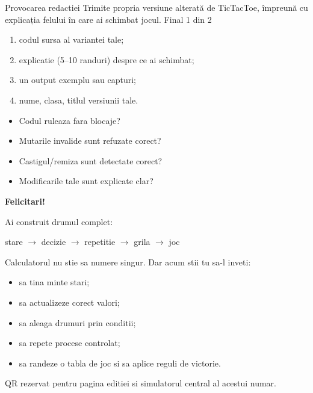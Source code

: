 \PageHeader
  {Provocarea redactiei}
  {Trimite propria versiune alterată de TicTacToe, împreună cu explicația felului în care ai schimbat jocul.}
  {Final 1 din 2}

\begin{bossbox}[Ce trimiti]
\begin{enumerate}
\item codul sursa al variantei tale;
\item explicatie (5--10 randuri) despre ce ai schimbat;
\item un output exemplu sau capturi;
\item nume, clasa, titlul versiunii tale.
\end{enumerate}
\end{bossbox}

\begin{solobox}
\begin{itemize}
\item Codul ruleaza fara blocaje?
\item Mutarile invalide sunt refuzate corect?
\item Castigul/remiza sunt detectate corect?
\item Modificarile tale sunt explicate clar?
\end{itemize}
\end{solobox}

\begin{conceptbox}
\end{conceptbox}

\clearpage

\thispagestyle{empty}
\begin{center}
{\Huge\bfseries Felicitari!}\par
\vspace{1.2em}
{\Large Ai construit drumul complet:}\par
\vspace{0.5em}
{\large stare \(\rightarrow\) decizie \(\rightarrow\) repetitie \(\rightarrow\) grila \(\rightarrow\) joc}
\end{center}

\vspace{1.8em}
\begin{missionbox}
Calculatorul nu stie sa numere singur. Dar acum stii tu sa-l inveti:
\begin{itemize}
\item sa tina minte stari;
\item sa actualizeze corect valori;
\item sa aleaga drumuri prin conditii;
\item sa repete procese controlat;
\item sa randeze o tabla de joc si sa aplice reguli de victorie.
\end{itemize}
\end{missionbox}

\vfill
\begin{center}
\QRCodePlaceholder

\smallskip
\small QR rezervat pentru pagina editiei si simulatorul central al acestui numar.
\end{center}

\clearpage
